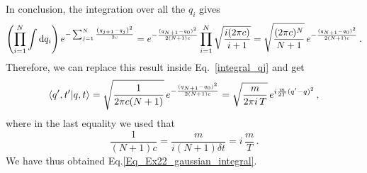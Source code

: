 \begin{sol}
\begin{enumerate}[label=\alph*)]
\begin{equation}
    \end{equation}
    In conclusion, the integration over all the $q_i$ gives
    \begin{equation}
        \left(\prod_{i=1}^N \int {\rm d} q_i \right) e^{-\sum_{j=1}^N\frac{\left(q_{j+1} - q_j\right)^2}{2c}}
        = e^{-\frac{(q_{N+1} - q_0)^2}{2(N+1)c}} \prod_{i=1}^{N} \sqrt{\frac{i (2\pi c)}{i+1}} = \sqrt{\frac{(2\pi c)^N}{N+1}} \, e^{-\frac{(q_{N+1} - q_0)^2}{2(N+1)c}} \, .
    \end{equation}
    Therefore, we can replace this result inside Eq.~\eqref{integral_qj} and get
    \begin{equation}
         \bra{q', t'}\ket{q, t} = \sqrt{\frac{1}{2 \pi c (N+1)}} \,  e^{-\frac{(q_{N+1} - q_0)^2}{2(N+1)c}} = \sqrt{\frac{m}{2 \pi i \, T}} \,  e^{i\frac{m}{2T} (q' - q)^2}\,,
    \end{equation}
    where in the last equality we used that 
    \begin{equation}
        \frac{1}{(N+1) c} = \frac{m}{i (N+1)\delta t} = i\, \frac{m}{T} \, .
    \end{equation}
    We have thus obtained Eq.\eqref{Eq_Ex22_gaussian_integral}.
    \end{enumerate}
    $ $
\end{sol}
